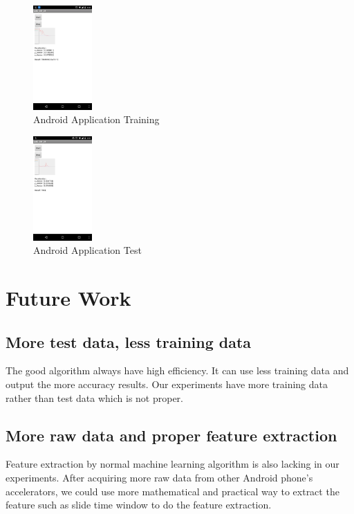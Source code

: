 \documentclass[12pt,twocolumn]{article}
\begin{document}
\begin{figure}[htbp]
\centering
\includegraphics[width=0.2\textwidth]{app_training}
\caption{Android Application Training}
\label{fig:app_training}
\end{figure}

\begin{figure}[htbp]
\centering
\includegraphics[width=0.2\textwidth]{app_test}
\caption{Android Application Test}
\label{fig:app_test}
\end{figure}

\section{Future Work}

\subsection{More test data, less training data}
The good algorithm always have high efficiency. It can use less training data and output the more accuracy results. Our experiments have more training data rather than test data which is not proper.

\subsection{More raw data and proper feature extraction}
Feature extraction by normal machine learning algorithm is also lacking in our experiments. After acquiring more raw data from other Android phone's accelerators, we could use more mathematical and practical way to extract the feature such as slide time window to do the feature extraction.
\end{document}
